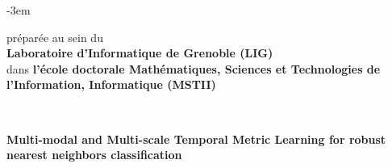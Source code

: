 \begin{titlepage}
\begin{adjustwidth}{}{-3em}
\begin{flushleft}
\vfill

\begin{flushright}
\begin{minipage}{\leftshift}
\begin{flushleft}
{préparée au sein du \\\textbf{Laboratoire d'Informatique de Grenoble (LIG)}\\
dans \textbf{l'école doctorale Mathématiques, Sciences et Technologies de l'Information, Informatique (MSTII)}}
\end{flushleft}
\end{minipage}
\end{flushright}~~\\[0.4cm]

\vfill

\begin{flushright}
\begin{minipage}{\leftshift}
\begin{flushleft}
{ \LARGE  \bfseries Multi-modal and Multi-scale Temporal Metric Learning for robust nearest neighbors classification}
\end{flushleft}
\end{minipage}
\end{flushright}~~\\[0.4cm]
\vfill


\end{flushleft}
\end{adjustwidth}
\end{titlepage}
